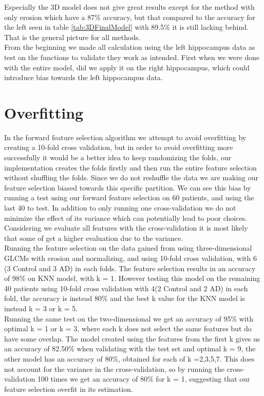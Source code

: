 Especially the 3D model does not give great results except for the method with only erosion which have a 87\% accuracy, but that compared to the accuracy for the left seen in table \ref{tab:3DFinalModel} with 89.5\% it is still lacking behind. That is the general picture for all methods.\\
From the beginning we made all calculation using the left hippocampus data as test on the functions to validate they work as intended. First when we were done with the entire model, did we apply it on the right hippocampus, which could introduce bias towards the left hippocampus data.

\section{Overfitting}
In the forward feature selection algorithm we attempt to avoid overfitting by creating a 10-fold cross validation, but in order to avoid overfitting more successfully it would be a better idea to keep randomizing the folds, our implementation creates the folds firstly and then run the entire feature selection without shuffling the folds. Since we do not reshuffle the data we are making our feature selection biased towards this specific partition. We can see this bias by running a test using our forward feature selection on 60 patients, and using the last 40 to test. In addition to only running one cross-validation we do not minimize the effect of its variance which can potentially lead to poor choices. Considering we evaluate all features with the cross-validation it is most likely that some of get a higher evaluation due to the variance.\\
Running the feature selection on the data gained from using three-dimensional GLCMs with erosion and normalizing, and using 10-fold cross validation, with 6 (3 Control and 3 AD) in each folds. The feature selection results in an accuracy of 98\% on KNN model, with k = 1. However testing this model on the remaining 40 patients using 10-fold cross validation with 4(2 Control and 2 AD) in each fold, the accuracy is instead 80\% and the best k value for the KNN model is instead  k = 3 or k = 5.\\
Running the same test on the two-dimensional we get an accuracy of 95\% with optimal k = 1 or k = 3, where each k does not select the same features but do have some overlap. The model created using the features from the first k gives us an accuracy of 82.50\% when validating with the test set and optimal k = 9, the other model has an accuracy of 80\%, obtained for each of k ={2,3,5,7}. This does not account for the variance in the cross-validation, so by running the cross-validation 100 times we get an accuracy of 80\% for k = 1, suggesting that our feature selection overfit in its estimation.\\
